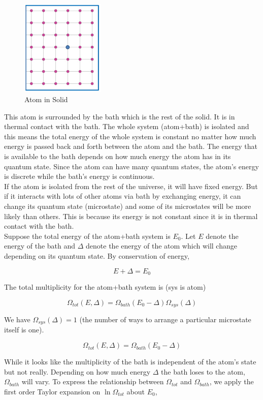 \begin{figure}[H]
	\centering
	\includegraphics[width=40mm]{12.png}
	\caption{Atom in Solid}
\end{figure}

This atom is surrounded by the bath which is the rest of the solid. It is in thermal contact with the bath. The whole system (atom+bath) is isolated and this means the total energy of the whole system is constant no matter how much energy is passed back and forth between the atom and the bath. The energy that is available to the bath depends on how much energy the atom has in its quantum state. Since the atom can have many quantum states, the atom's energy is discrete while the bath's energy is continuous. \\

If the atom is isolated from the rest of the universe, it will have fixed energy. But if it interacts with lots of other atoms via bath by exchanging energy, it can change its quantum state (microstate) and some of its microstates will be more likely than others. This is because its energy is not constant since it is in thermal contact with the bath. \\

Suppose the total energy of the atom+bath system is $E_0$. Let $E$ denote the energy of the bath and $\Delta$ denote the energy of the atom which will change depending on its quantum state. By conservation of energy,

$$E+\Delta=E_0$$

The total multiplicity for the atom+bath system is (sys is atom)

$$\Omega_{tot}(E,\Delta)=\Omega_{bath}(E_0-\Delta)\Omega_{sys}(\Delta)$$

We have $\Omega_{sys}(\Delta)=1$ (the number of ways to arrange a particular microstate itself is one).

$$\Omega_{tot}(E,\Delta)=\Omega_{bath}(E_0-\Delta)$$

While it looks like the multiplicity of the bath is independent of the atom's state but not really. Depending on how much energy $\Delta$ the bath loses to the atom, $\Omega_{bath}$ will vary. To express the relationship between $\Omega_{tot}$ and $\Omega_{bath}$, we apply the first order Taylor expansion on $\ln\Omega_{tot}$ about $E_0$,

